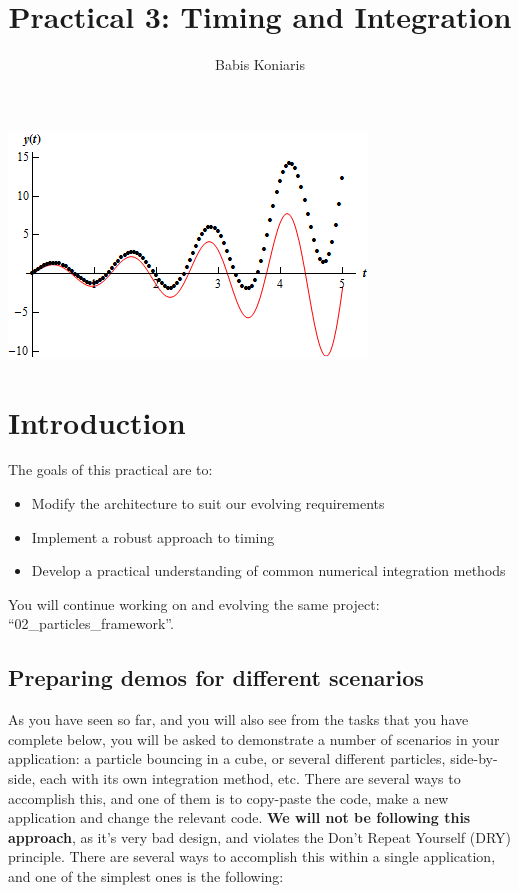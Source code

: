 \documentclass[12pt]{article}
\title{\textbf{Practical 3: Timing and Integration}}
\author{Babis Koniaris}
\date{}
\begin{document}
\maketitle

\begin{center}
\includegraphics[width=\textwidth,height=\textheight,keepaspectratio]{p3-teaser.png}
\end{center}
\pagebreak

\section*{Introduction}

The goals of this practical are to:

\begin{itemize}
\item Modify the architecture to suit our evolving requirements
\item Implement a robust approach to timing
\item Develop a practical understanding of common numerical integration methods
\end{itemize}

You will continue working on and evolving the same project: ``02\_particles\_framework''.

\subsection*{Preparing demos for different scenarios}

As you have seen so far, and you will also see from the tasks that you have complete below, you will be asked to demonstrate a number of scenarios in your application: a particle bouncing in a cube, or several different particles, side-by-side, each with its own integration method, etc. There are several ways to accomplish this, and one of them is to copy-paste the code, make a new application and change the relevant code. \textbf{We will not be following this approach}, as it's very bad design, and violates the Don't Repeat Yourself (DRY) principle. There are several ways to accomplish this within a single application, and one of the simplest ones is the following:
\end{document}
